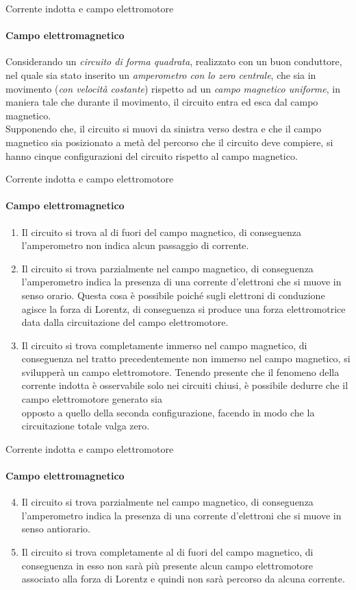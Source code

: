 \documentclass[aspectratio=169]{beamer}
\begin{document}
\begin{frame}{Corrente indotta e campo elettromotore}
	\framesubtitle{Campo elettromagnetico}
	Considerando un \emph{circuito di forma quadrata}, realizzato con un buon conduttore, nel quale sia stato inserito un \emph{amperometro con lo zero centrale}, che sia in movimento (\emph{con velocità costante}) rispetto ad un \emph{campo magnetico uniforme},  in maniera tale che durante il movimento, il circuito entra ed esca dal campo magnetico.\\
	Supponendo che, il circuito si muovi da sinistra verso destra e che il campo magnetico sia posizionato a metà del percorso che il circuito deve compiere, si hanno cinque configurazioni del circuito rispetto al campo magnetico.\\
	\end{frame}

\begin{frame}{Corrente indotta e campo elettromotore}
	\framesubtitle{Campo elettromagnetico}
	\begin{enumerate}
	\item Il circuito si trova al di fuori del campo magnetico, di conseguenza l'amperometro non indica alcun passaggio di corrente.
	\item Il circuito si trova parzialmente nel campo magnetico, di conseguenza l'amperometro indica la presenza di una corrente d'elettroni che si muove in senso orario. Questa cosa è possibile poiché sugli elettroni di conduzione agisce la forza di Lorentz, di conseguenza si produce una forza elettromotrice data dalla circuitazione del campo elettromotore.
	\item Il circuito si trova completamente immerso nel campo magnetico, di conseguenza nel tratto precedentemente non immerso nel campo magnetico, si  svilupperà un campo elettromotore. Tenendo presente che il fenomeno della corrente indotta è osservabile solo nei circuiti chiusi, è possibile dedurre che il campo elettromotore generato sia\\ opposto a quello della seconda configurazione, facendo in modo che la\\ circuitazione totale valga zero.
\end{enumerate}
	\end{frame}

\begin{frame}{Corrente indotta e campo elettromotore}
	\framesubtitle{Campo elettromagnetico}
	\begin{enumerate}
		\setcounter{enumi}{3}
		\item Il circuito si trova parzialmente nel campo magnetico, di conseguenza l'amperometro indica la presenza di una corrente d'elettroni che si muove in senso antiorario. 
		\item Il circuito si trova completamente al di fuori del campo magnetico, di conseguenza in esso non sarà più presente alcun campo elettromotore associato alla forza di Lorentz e quindi non sarà percorso da alcuna corrente.
	\end{enumerate}
\end{frame}
\end{document}
